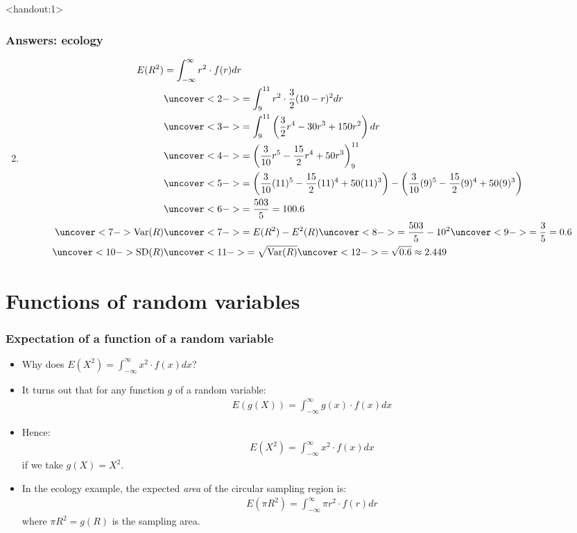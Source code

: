 \documentclass[handout]{beamer}\usepackage[]{graphicx}\usepackage[]{color}
\newcommand{\answers}{1}
\numberwithin{equation}{section}
\begin{document}
\begin{frame}<handout:\answers>
\frametitle{Answers: ecology} \scriptsize
\begin{enumerate}[1. ]
\setcounter{enumi}{1}
\item 
\begin{align*}
E(R^2) &= \int_{-\infty}^\infty r^2 \cdot f(r) dr \\
&\uncover<2->{= \int_9^{11} r^2 \cdot \frac{3}{2} (10 - r)^2 dr }\\
&\uncover<3->{= \int_{9}^{11} \left (\frac{3}{2} r^4 - 30 r^3+ 150 r^2 \right ) dr} \\
&\uncover<4->{= \left (\frac{3}{10} r^5 - \frac{15}{2} r^4 + 50 r^3 \right )_9^{11}} \\
&\uncover<5->{= \left (\frac{3}{10} (11)^5 - \frac{15}{2} (11)^4 + 50 (11)^3 \right ) - \left (\frac{3}{10} (9)^5 - \frac{15}{2} (9)^4 + 50 (9)^3 \right )} \\
&\uncover<6->{= \frac{503}{5}  = 100.6} \\
\uncover<7->{\text{Var}(R)} & \uncover<7->{= E(R^2) - E^2(R)} \uncover<8->{ = \frac{503}{5} - 10^2} \uncover<9->{= \frac{3}{5} = 0.6} \\
\uncover<10->{\text{SD}(R)} & \uncover<11->{= \sqrt{\text{Var}(R)}} \uncover<12->{ = \sqrt{0.6} \approx 2.449}
\end{align*}
\end{enumerate}
\end{frame}


\section{Functions of random variables}

\begin{frame}
\frametitle{Expectation of a function of a random variable}
\begin{itemize}
\item Why does $E(X^2) = \int_{-\infty}^\infty x^2 \cdot f(x) dx$? 
\pause \item It turns out that for any function $g$ of a random variable:
\pause \begin{align*}
E(g(X)) = \int_{-\infty}^\infty g(x) \cdot f(x) dx\end{align*}
\pause \item Hence: \begin{align*}
E(X^2) = \int_{-\infty}^\infty x^2 \cdot f(x) dx
\end{align*}
if we take $g(X) = X^2$.
\pause \item In the ecology example, the expected \emph{area} of the circular sampling region is:
\pause \begin{align*}
E(\pi R^2) = \int_{-\infty}^\infty \pi r^2 \cdot f(r) dr
\end{align*}
where $\pi R^2 = g(R)$ is the sampling area.
\end{itemize}
\end{frame}
\end{document}
